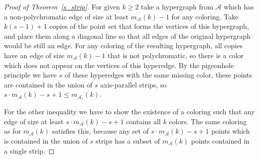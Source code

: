 \documentclass[10pt,a4paper]{amsart}
\newcommand{\A}{\mathcal{A}}
\begin{document}
\begin{proof}[Proof of Theorem~\ref{s_strip}]

For given $k\ge 2$ take a hypergraph from $\A$ which has a non-poly\-chromatic edge of size at least $m_\A(k)-1$ for any coloring. Take $k(s-1)+1$ copies of the point set that forms the vertices of this hypergraph, and place them along a diagonal line so that all edges of the original hypergraph would be still an edge. For any coloring of the resulting hypergraph, all copies have an edge of size $m_\A(k)-1$ that is not polychromatic, so there is a color which does not appear on the vertices of this hyperedge. By the pigeonhole principle we have $s$ of these hyperedges with the same missing color, these points are contained in the union of $s$ axis-parallel strips, so $s \cdot m_\A(k) -s + 1 \le m_{\A_s}(k)$.

For the other inequality we have to show the existence of a coloring such that any edge of size at least $s \cdot m_\A(k) -s + 1$ contains all $k$ colors. The same coloring as for $m_\A(k)$ satisfies this, because any set of $s \cdot m_\A(k) -s + 1$ points which is contained in the union of $s$ strips has a subset of $m_\A(k)$ points contained in a single strip.
\end{proof}
\end{document}
